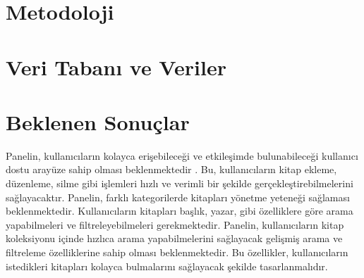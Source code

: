 \documentclass[12pt, a4paper]{article}
\begin{document}
\newpage
\section{Metodoloji}	


\section{Veri Tabanı ve Veriler}	


\section{Beklenen Sonuçlar}

Panelin, kullanıcıların kolayca erişebileceği ve etkileşimde bulunabileceği kullanıcı dostu arayüze sahip olması beklenmektedir . Bu, kullanıcıların kitap ekleme, düzenleme, silme gibi işlemleri hızlı ve verimli bir şekilde gerçekleştirebilmelerini  sağlayacaktır.\newline
Panelin, farklı kategorilerde kitapları yönetme yeteneği sağlaması beklenmektedir. Kullanıcıların kitapları başlık, yazar,  gibi özelliklere göre arama yapabilmeleri ve filtreleyebilmeleri gerekmektedir.\newline
Panelin, kullanıcıların kitap koleksiyonu içinde hızlıca arama yapabilmelerini sağlayacak gelişmiş arama ve filtreleme özelliklerine sahip olması beklenmektedir. Bu özellikler, kullanıcıların istedikleri kitapları kolayca bulmalarını sağlayacak şekilde tasarlanmalıdır.\newpage


	
	 
	
	
\end{document}
